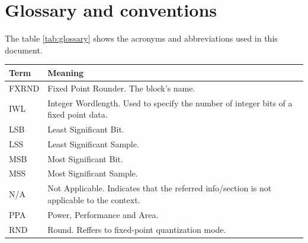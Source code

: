 
\section{Glossary and conventions}
\label{sec:glossary_and_conventions}

The table \ref{tab:glossary} shows the acronyms and abbreviations used in this document.
\begin{table}[h]	
    \centering
    \begin{tabular}{|>{\centering\arraybackslash}p{1.5cm}|
                     >{\raggedright\arraybackslash}p{6.5cm}|}
		\arrayrulecolor{sandnavy!50}\hline
		\rowcolor{sandnavy!50}\hline
        \textcolor{sandwhite}{\textbf{Term}}    &
        \textcolor{sandwhite}{\textbf{Meaning}} \\ \hline
        FXRND & Fixed Point Rounder. The block's name.                                                     \\ \hline
        IWL   & Integer Wordlength. Used to specify the number of integer bits of a fixed point data.      \\ \hline
        LSB   & Least Significant Bit.                                                                     \\ \hline
        LSS   & Least Significant Sample.                                                                  \\ \hline
        MSB   & Most Significant Bit.                                                                      \\ \hline
        MSS   & Most Significant Sample.                                                                   \\ \hline
        N/A   & Not Applicable. Indicates that the referred info/section is not applicable to the context. \\ \hline
        PPA   & Power, Performance and Area.                                                               \\ \hline
        RND   & Round. Reffers to fixed-point quantization mode.                                           \\ \hline

\end{tabular}
\end{table}
